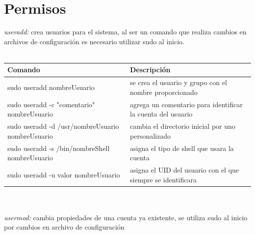 \documentclass[10pt,a4paper,titlepage]{article}
\begin{document}
	\section*{Permisos}
	\emph{useradd:} crea usuarios para el sistema, al ser un comando que realiza cambios en archivos de configuración es necesario utilizar sudo al inicio.
	\\
	\\
	\begin{tabular}{|p{8cm}|p{6cm}|}
		\hline
		Comando & Descripción \\
		\hline
		sudo useradd nombreUsuario & se crea el usuario y grupo con el nombre proporcionado \\
		\hline
		sudo useradd -c "comentario" nombreUsuario & agrega un comentario para identificar la cuenta del usuario \\
		\hline
		sudo useradd -d /usr/nombreUsuario nombreUsuario & cambia el directorio inicial por uno personalizado \\
		\hline
		sudo useradd -s /bin/nombreShell nombreUsuario & asigna el tipo de shell que usara la cuenta \\
		\hline
		sudo useradd -u valor nombreUsuario & asigna el UID del usuario con el que siempre se identificara \\
		\hline
	\end{tabular}
	\\
	\\
	\emph{usermod:} cambia propiedades de una cuenta ya existente, se utiliza sudo al inicio por cambios en archivo de configuración
	\\
	\\
\end{document}

